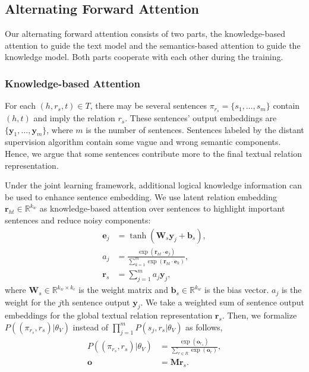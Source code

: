\documentclass[letterpaper]{article} %
\begin{document}
\subsection{Alternating Forward Attention}

Our alternating forward attention consists of two parts, the knowledge-based attention to guide the text model and the semantics-based attention to guide the knowledge model. Both parts cooperate with each other during the training.

\subsubsection{Knowledge-based Attention}

For each $(h, r_s, t) \in T$, there may be several sentences $\pi_{r_s}=\{s_1,\ldots,s_m\}$ contain $(h, t)$ and imply the relation $r_s$. These sentences' output embeddings are $\{\mathbf{y}_1, \ldots , \mathbf{y}_m\}$, where $m$ is the number of sentences. Sentences labeled by the distant supervision algorithm contain some vague and wrong semantic components. Hence, we argue that some sentences contribute more to the final textual relation representation. 

Under the joint learning framework, additional logical knowledge information can be used to enhance sentence embedding. We use latent relation embedding $\mathbf{r}_{ht} \in \mathbb{R}^{k_w} $ as knowledge-based attention over sentences to highlight important sentences and reduce noisy components:
\begin{align}
\label{eq:att_k}
\mathbf{e}_j & = \tanh(\mathbf{W}_s\mathbf{y}_j+\mathbf{b}_s), \\\nonumber
a_j & =\frac{\exp(\mathbf{r}_{ht}\cdot\mathbf{e}_j)}{\sum_{k = 1}^{m} \exp(\mathbf{r}_{ht}\cdot\mathbf{e}_k)}, \\\nonumber
\mathbf{r}_s & = \sum_{j = 1}^{m} a_j\mathbf{y}_j,
\end{align}
where $\mathbf{W}_s \in \mathbb{R}^{k_w \times k_c}$ is the weight matrix and $\mathbf{b}_s \in \mathbb{R}^{k_w}$ is the bias vector. $a_j$ is the weight for the $j$th sentence output $\mathbf{y}_j$. We take a weighted sum of sentence output embeddings for the global textual relation representation $\mathbf{r}_s$. Then, we formalize $P((\pi_{r_s}, r_s)|{\theta_V})$ instead of $\prod_{j=1}^{m}P(s_j, r_s|{\theta_V})$ as follows,
\begin{align}
P((\pi_{r_s}, r_s)|{\theta_V}) &= \frac{\exp(\mathbf{o}_{r_s})}{\sum_{r \in R} \exp(\mathbf{o}_{r})},	\\\nonumber
\mathbf{o} &= \mathbf{M}\mathbf{r}_s.
\end{align}
\end{document}
